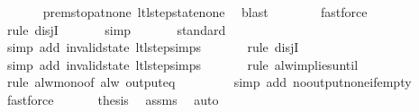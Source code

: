 \begin{isabellebody}
\ \ \ \ \ \isamarkupfalse%
\ prem{\isacharunderscore}stop{\isacharunderscore}at{\isacharunderscore}none\ ltl{\isacharunderscore}step{\isacharunderscore}state{\isacharunderscore}none\ \isamarkupfalse%
\ blast\isanewline
\ \ \ \ \ \ \isamarkupfalse%
\ fastforce\isanewline
\isanewline
\ \ \ \ \ \isamarkupfalse%
\ {\isacharparenleft}rule\ disjI{}{\isacharparenright}{\isacharplus}\isanewline
\ \ \ \ \ \isamarkupfalse%
\ simp\isanewline
\ \ \ \ \ \isamarkupfalse%
\ standard\isanewline
\ \ \ \ \ \isamarkupfalse%
\ {\isacharparenleft}simp\ add{\isacharcolon}\ invalid{\isacharunderscore}state\ ltl{\isacharunderscore}step{\isachardot}simps{\isacharparenright}\isanewline
\ \ \ \ \ \isamarkupfalse%
\ {\isacharparenleft}rule\ disjI{}{\isacharparenright}\isanewline
\ \ \ \ \ \isamarkupfalse%
\ {\isacharparenleft}simp\ add{\isacharcolon}\ invalid{\isacharunderscore}state\ ltl{\isacharunderscore}step{\isachardot}simps{\isacharparenright}\isanewline
\ \ \ \ \ \isamarkupfalse%
\ {\isacharparenleft}rule\ alw{\isacharunderscore}implies{\isacharunderscore}until{\isacharparenright}\isanewline
\ \ \ \ \ \isamarkupfalse%
\ {\isacharparenleft}rule\ alw{\isacharunderscore}mono{\isacharbrackleft}of\ {\isachardoublequoteopen}alw\ {\isacharparenleft}output{\isacharunderscore}eq\ {\isacharbrackleft}{\isacharbrackright}{\isacharparenright}{\isachardoublequoteclose}{\isacharbrackright}{\isacharparenright}\isanewline
\ \ \ \ \ \ \isamarkupfalse%
\ {\isacharparenleft}simp\ add{\isacharcolon}\ no{\isacharunderscore}output{\isacharunderscore}none{\isacharunderscore}if{\isacharunderscore}empty{\isacharparenright}\isanewline
\ \ \ \ \ \isamarkupfalse%
\ fastforce\isanewline
\ \ \isacommand{{\isacharbraceright}}\isamarkupfalse%
\isanewline
\ \ \isamarkupfalse%
\ {\isacharquery}thesis\ \isamarkupfalse%
\ assms\ \isamarkupfalse%
\ auto\isanewline
{}\isamarkupfalse%
%
\endisatagproof
{\isafoldproof}%
%
\isadelimproof
%
\endisadelimproof
%
\end{isabellebody}
